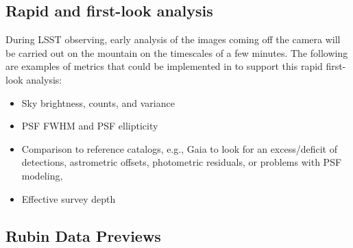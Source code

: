 \subsection{Rapid and first-look analysis} \label{ssec:rapid}

During LSST observing, early analysis of the images coming off the camera will be carried out on the mountain on the timescales of a few minutes. 
The following are examples of metrics that could be implemented in \faro to support this rapid first-look analysis:
\begin{itemize}
\item Sky brightness, counts, and variance
\item PSF FWHM and PSF ellipticity
\item Comparison to reference catalogs, e.g., Gaia to look for an excess/deficit of detections, astrometric offsets, photometric residuals, or problems with PSF modeling,
\item Effective survey depth
\end{itemize}

\subsection{Rubin Data Previews} \label{ssec:datapreviews}

